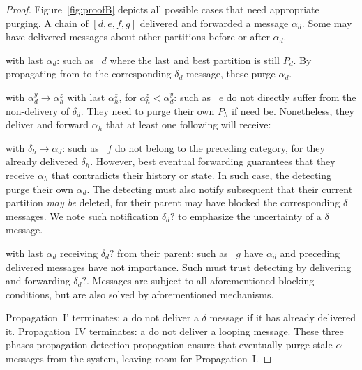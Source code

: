 \begin{proof}
  Figure~\ref{fig:proofB} depicts all possible cases that need
  appropriate purging. A chain of \processes $[d, e, f, g]$ delivered
  and forwarded a message $\alpha_d$. Some \processes may have
  delivered messages about other partitions before or after
  $\alpha_d$.
  \begin{asparadesc}
  \item [\processes with last $\alpha_d$:] \Processes such as
    \Process~$d$ where the last and best partition is still $P_d$. By
    propagating from \process to \process the corresponding $\delta_d$
    message, these \processes purge $\alpha_d$.
  \item [\processes with $\alpha_d^y \rightarrow \alpha_h^z$ with last
    $\alpha_h^z$, for $\alpha_h^z < \alpha_d^y$:] \Processes such as
    \Process~$e$ do not directly suffer from the non-delivery of
    $\delta_d$. They need to purge their own $P_h$ if need
    be. Nonetheless, they deliver and forward $\alpha_h$ that at least
    one following \process will receive:
  \item [\processes with $\delta_h \rightarrow \alpha_d$:] \Processes
    such as \Process~$f$ do not belong to the preceding category, for
    they already delivered $\delta_h$. However, best eventual
    forwarding guarantees that they receive $\alpha_h$ that
    contradicts their history or state. In such case, the detecting
    \processes purge their own $\alpha_d$. The detecting \processes
    must also notify subsequent \processes that their current
    partition \emph{may be} deleted, for their parent may have blocked
    the corresponding $\delta$ messages. We note such notification
    $\delta_d?$ to emphasize the uncertainty of a $\delta$ message.
  \item [\processes with last $\alpha_d$ receiving $\delta_d?$ from
    their parent:] \Processes such as \Process~$g$ have $\alpha_d$ and
    preceding delivered messages have not importance. Such \processes
    must trust detecting \processes by delivering and forwarding
    $\delta_d?$. Messages are subject to all aforementioned blocking
    conditions, but are also solved by aforementioned mechanisms.
  \end{asparadesc}

  Propagation~I' terminates: a \process do not deliver a $\delta$
  message if it has already delivered it. Propagation~IV terminates: a
  \process do not deliver a looping message.
  These three phases propagation-detection-propagation ensure that
  \processes eventually purge stale $\alpha$ messages from the system,
  leaving room for Propagation~I.
\end{proof}

